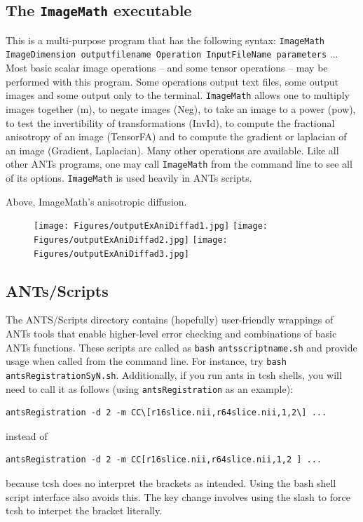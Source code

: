 \documentclass{InsightArticle}
\begin{document}
\subsection{The \texttt{ImageMath} executable} This is a multi-purpose program
that has the following syntax:  \texttt{ImageMath ImageDimension
outputfilename   Operation  InputFileName  parameters} ...  Most basic
scalar image operations -- and some tensor operations -- may be
performed with this program.  Some operations output text files, some
output images and some output only to the terminal.   \texttt{ImageMath} allows
one to multiply images together (m), to negate images (Neg), to take
an image to a power (pow), to test the invertibility of
transformations (InvId), to compute the fractional anisotropy of an
image (TensorFA) and to compute the gradient or laplacian of an image
(Gradient, Laplacian).   Many other operations are available.  Like
all other ANTs programs, one may call \texttt{ImageMath} from the
command line to see all of its options.   \texttt{ImageMath} is used
heavily in ANTs scripts.  

Above, ImageMath's anisotropic diffusion.
\begin{figure}
\texttt{[image: Figures/outputExAniDiffad1.jpg]} 
\texttt{[image: Figures/outputExAniDiffad2.jpg]} 
\texttt{[image: Figures/outputExAniDiffad3.jpg]} 
\vspace{-0.1in}
\label{fig:cmd}
\end{figure}


\subsection{ANTs/Scripts} 
The ANTS/Scripts directory contains (hopefully) user-friendly
wrappings of ANTs tools that enable higher-level error checking and
combinations of basic ANTs functions.  These scripts are called as
\texttt{bash}  \texttt{antsscriptname.sh}  and provide usage when called
from the command line.  For instance, try \texttt{bash}  \texttt{antsRegistrationSyN.sh}.
Additionally, if you run ants in tcsh shells, you will need to call it
as follows (using \texttt{antsRegistration} as an example):
\begin{verbatim}
antsRegistration -d 2 -m CC\[r16slice.nii,r64slice.nii,1,2\] ...
\end{verbatim}
instead of
\begin{verbatim}
antsRegistration -d 2 -m CC[r16slice.nii,r64slice.nii,1,2 ] ...
\end{verbatim}
because tcsh does no interpret the brackets as intended.  Using the
bash shell script interface also avoids this.  The key change involves using the slash to force tcsh to 
interpet the bracket literally. 
\newpage
\end{document}

